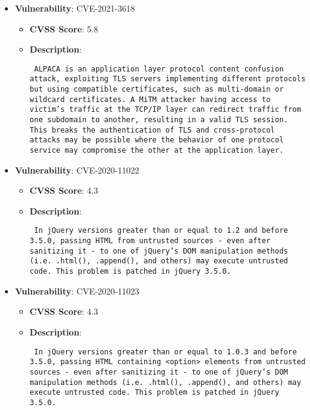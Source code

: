 \documentclass{article}
\begin{document}
\begin{itemize}
        \item \textbf{Vulnerability}: CVE-2021-3618
        \begin{itemize}
            \item \textbf{CVSS Score}:  5.8 
            \item \textbf{Description}: \parbox{\linewidth}{\texttt{ ALPACA is an application layer protocol content confusion attack, exploiting TLS servers implementing different protocols but using compatible certificates, such as multi-domain or wildcard certificates. A MiTM attacker having access to victim's traffic at the TCP/IP layer can redirect traffic from one subdomain to another, resulting in a valid TLS session. This breaks the authentication of TLS and cross-protocol attacks may be possible where the behavior of one protocol service may compromise the other at the application layer. }}
        \end{itemize}
    
        \item \textbf{Vulnerability}: CVE-2020-11022
        \begin{itemize}
            \item \textbf{CVSS Score}:  4.3 
            \item \textbf{Description}: \parbox{\linewidth}{\texttt{ In jQuery versions greater than or equal to 1.2 and before 3.5.0, passing HTML from untrusted sources - even after sanitizing it - to one of jQuery's DOM manipulation methods (i.e. .html(), .append(), and others) may execute untrusted code. This problem is patched in jQuery 3.5.0. }}
        \end{itemize}
    
        \item \textbf{Vulnerability}: CVE-2020-11023
        \begin{itemize}
            \item \textbf{CVSS Score}:  4.3 
            \item \textbf{Description}: \parbox{\linewidth}{\texttt{ In jQuery versions greater than or equal to 1.0.3 and before 3.5.0, passing HTML containing <option> elements from untrusted sources - even after sanitizing it - to one of jQuery's DOM manipulation methods (i.e. .html(), .append(), and others) may execute untrusted code. This problem is patched in jQuery 3.5.0. }}
        \end{itemize}
    
\end{itemize}
\end{document}
